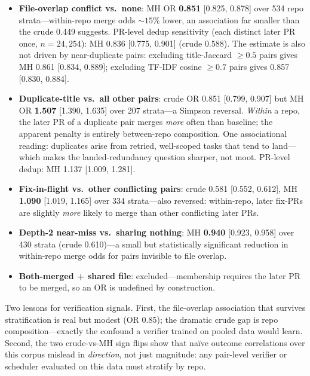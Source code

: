 \documentclass{article}
\begin{document}
\begin{itemize}
  \item \textbf{File-overlap conflict vs.\ none}: MH OR \textbf{0.851} [0.825, 0.878] over 534 repo strata---within-repo merge odds ${\sim}15\%$ lower, an association far smaller than the crude 0.449 suggests. %
  PR-level dedup sensitivity (each distinct later PR once, $n=24{,}254$): MH 0.836 [0.775, 0.901] (crude 0.588). %
  The estimate is also not driven by near-duplicate pairs: excluding title-Jaccard $\geq 0.5$ pairs gives MH 0.861 [0.834, 0.889]; excluding TF-IDF cosine $\geq 0.7$ pairs gives 0.857 [0.830, 0.884]. %
  \item \textbf{Duplicate-title vs.\ all other pairs}: crude OR 0.851 [0.799, 0.907] but MH OR \textbf{1.507} [1.390, 1.635] over 207 strata---a Simpson reversal. \emph{Within} a repo, the later PR of a duplicate pair merges \emph{more} often than baseline; the apparent penalty is entirely between-repo composition. One associational reading: duplicates arise from retried, well-scoped tasks that tend to land---which makes the landed-redundancy question sharper, not moot. PR-level dedup: MH 1.137 [1.009, 1.281]. %
  \item \textbf{Fix-in-flight vs.\ other conflicting pairs}: crude 0.581 [0.552, 0.612], MH \textbf{1.090} [1.019, 1.165] over 334 strata---also reversed: within-repo, later fix-PRs are slightly \emph{more} likely to merge than other conflicting later PRs. %
  \item \textbf{Depth-2 near-miss vs.\ sharing nothing}: MH \textbf{0.940} [0.923, 0.958] over 430 strata (crude 0.610)---a small but statistically significant reduction in within-repo merge odds for pairs invisible to file overlap. %
  \item \textbf{Both-merged + shared file}: excluded---membership requires the later PR to be merged, so an OR is undefined by construction. %
\end{itemize}

Two lessons for verification signals. First, the file-overlap association that survives stratification is real but modest (OR 0.85); the dramatic crude gap is repo composition---exactly the confound a verifier trained on pooled data would learn. Second, the two crude-vs-MH sign flips show that na\"ive outcome correlations over this corpus mislead in \emph{direction}, not just magnitude: any pair-level verifier or scheduler evaluated on this data must stratify by repo.
\end{document}
